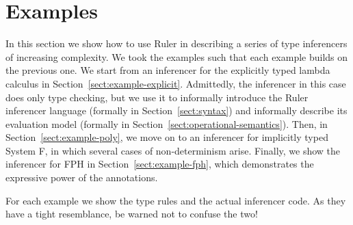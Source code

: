 \documentclass[preprint,natbib]{sigplanconf}
\begin{document}
\section{Examples}
\label{sect:examples}

  In this section we show how to use Ruler in describing a series of type inferencers of increasing complexity.
  We took the examples such
  that each example builds on the previous one. We start from an
  inferencer for the explicitly typed lambda calculus in
  Section~\ref{sect:example-explicit}. Admittedly, the inferencer
  in this case does only type checking, but we use it to informally
  introduce the Ruler inferencer language (formally in
  Section~\ref{sect:syntax}) and informally describe its evaluation
  model (formally in Section~\ref{sect:operational-semantics}). Then,
  in Section~\ref{sect:example-poly}, we move on to an inferencer for
  implicitly typed System F, in which several cases of
  non-determinism arise. Finally, we show the inferencer for FPH in
  Section~\ref{sect:example-fph}, which demonstrates the expressive power of the
  annotations.

  For each example we show the type rules and the actual inferencer
  code. As they have a tight resemblance, be warned not to confuse the
  two!
\end{document}
